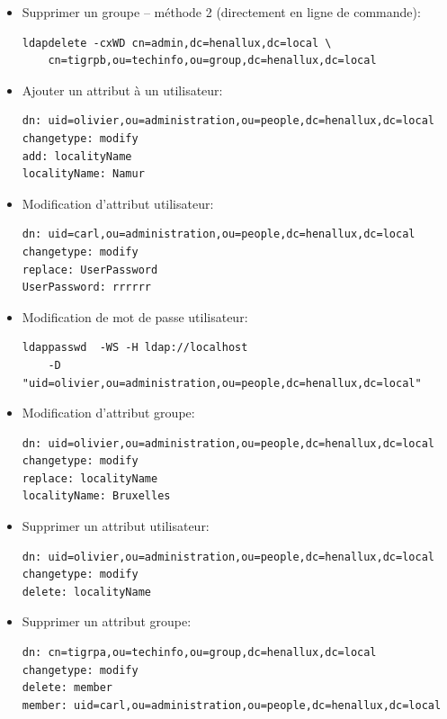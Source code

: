 \documentclass[a4paper]{article}
\begin{document}
\begin{itemize}
\item Supprimer un groupe -- méthode 2 (directement en ligne de commande):
\begin{verbatim}
ldapdelete -cxWD cn=admin,dc=henallux,dc=local \
    cn=tigrpb,ou=techinfo,ou=group,dc=henallux,dc=local    
\end{verbatim}


\item Ajouter un attribut à un utilisateur:
\begin{example} \begin{verbatim}
dn: uid=olivier,ou=administration,ou=people,dc=henallux,dc=local
changetype: modify
add: localityName
localityName: Namur
\end{verbatim} \end{example}


\item Modification d’attribut utilisateur:
\begin{example} \begin{verbatim}
dn: uid=carl,ou=administration,ou=people,dc=henallux,dc=local
changetype: modify
replace: UserPassword
UserPassword: rrrrrr
\end{verbatim} \end{example}


\item Modification de mot de passe utilisateur:
\begin{verbatim}
ldappasswd  -WS -H ldap://localhost
    -D "uid=olivier,ou=administration,ou=people,dc=henallux,dc=local"
\end{verbatim}


\item Modification d’attribut groupe:
\begin{example} \begin{verbatim}
dn: uid=olivier,ou=administration,ou=people,dc=henallux,dc=local
changetype: modify
replace: localityName
localityName: Bruxelles
\end{verbatim} \end{example}


\item Supprimer un attribut utilisateur:
\begin{example} \begin{verbatim}
dn: uid=olivier,ou=administration,ou=people,dc=henallux,dc=local
changetype: modify
delete: localityName
\end{verbatim} \end{example}


\item Supprimer un attribut groupe:
\begin{example} \begin{verbatim}
dn: cn=tigrpa,ou=techinfo,ou=group,dc=henallux,dc=local
changetype: modify
delete: member
member: uid=carl,ou=administration,ou=people,dc=henallux,dc=local
\end{verbatim} \end{example}


\end{itemize}
\end{document}
